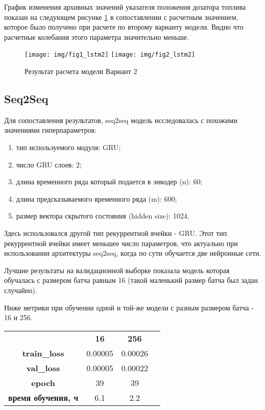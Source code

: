\documentclass[12pt,a4paper]{article}
\begin{document}
График изменения архивных значений указателя положения дозатора топлива  показан на следующем рисунке \ref{fig:res_lstm2} в сопоставлении с расчетным значением, которое было получено при расчете по второму варианту модели. Видно что расчетные колебания этого параметра значительно меньше.

\begin{figure}[htb]
	\centering\texttt{[image: img/fig1\_lstm2]}
	\centering\texttt{[image: img/fig2\_lstm2]}
	\caption{Результат расчета модели Вариант 2}
	\label{fig:res_lstm2}
\end{figure}


\subsection{Seq2Seq}

\begin{description}
	\item Для сопоставления результатов, seq2seq модель исследовалась с похожими значениями гиперпараметров:
	\begin{enumerate}
		\item тип используемого модуля: GRU;
		\item число GRU слоев: 2;
		\item длина временного ряда который подается в энкодер (n): 60;
		\item длина предсказываемого временного ряда (m): 600;
		\item размер вектора скрытого состояния (hidden size): 1024.	
	\end{enumerate}
\end{description}

Здесь использовался другой тип рекуррентной ячейки - GRU. Этот тип рекуррентной ячейки имеет меньшее число параметров, что актуально при использовании архитектуры seq2seq, когда по сути обучается две нейронные сети.

Лучшие результаты на валидационной выборке показала модель которая обучалась с размером батча равным 16 (такой маленький размер батча был задан случайно).

Ниже метрики при обучении одной и той-же модели с разным размером батча - 16 и 256.

\begin{center}
	\begin{tabular}{ |c|c|c|c| } 
		\hline
		& {\bf 16} & {\bf 256} \\ 
		{\bf train\_loss} & 0.00005 & 0.00026 \\ 
		{\bf val\_loss} & 0.00005 & 0.00022 \\
		{\bf epoch} & 39 & 39 \\
		{\bf время обучения, ч} & 6.1 & 2.2 \\
		\hline
	\end{tabular}
\end{center}
\end{document}
